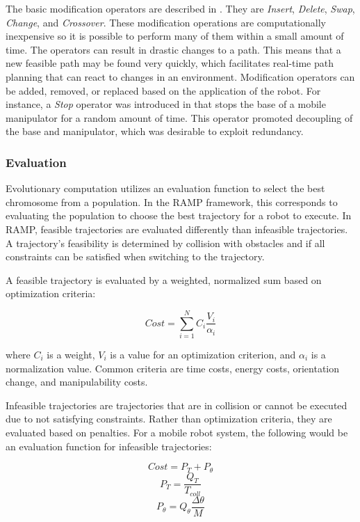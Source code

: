\documentclass[10pt,conference]{ieeeconf}
\begin{document}
The basic modification operators are described in \cite{EPN_Adaptive}. They are \emph{Insert}, \emph{Delete}, \emph{Swap}, \emph{Change}, and \emph{Crossover}. These modification operations are computationally inexpensive so it is possible to perform many of them within a small amount of time. The operators can result in drastic changes to a path. This means that a new feasible path may be found very quickly, which facilitates real-time path planning that can react to changes in an environment. Modification operators can be added, removed, or replaced based on the application of the robot. For instance, a \emph{Stop} operator was introduced in \cite{RAMP} that stops the base of a mobile manipulator for a random amount of time. This operator promoted decoupling of the base and manipulator, which was desirable to exploit redundancy. 


\subsubsection{Evaluation}

Evolutionary computation utilizes an evaluation function to select the best chromosome from a population. In the RAMP framework, this corresponds to evaluating the population to choose the best trajectory for a robot to execute. In RAMP, feasible trajectories are evaluated differently than infeasible trajectories. A trajectory's feasibility is determined by collision with obstacles and if all constraints can be satisfied when switching to the trajectory.

A feasible trajectory is evaluated by a weighted, normalized sum based on optimization criteria:

\begin{equation}
	Cost = \sum_{i=1}^{N} C_i\frac{V_i}{\alpha_i}
\end{equation}

where $C_i$ is a weight, $V_i$ is a value for an optimization criterion, and $\alpha_i$ is a normalization value. Common criteria are time costs, energy costs, orientation change, and manipulability costs.

Infeasible trajectories are trajectories that are in collision or cannot be executed due to not satisfying constraints. Rather than optimization criteria, they are evaluated based on penalties. For a mobile robot system, the following would be an evaluation function for infeasible trajectories:

\begin{equation}
Cost = P_T + P_\theta
\end{equation}
\begin{equation}
P_T = \frac{Q_T}{T_{coll}}
\end{equation}
\begin{equation}
P_\theta = Q_\theta\frac{\Delta\theta}{M}
\end{equation}
\end{document}
